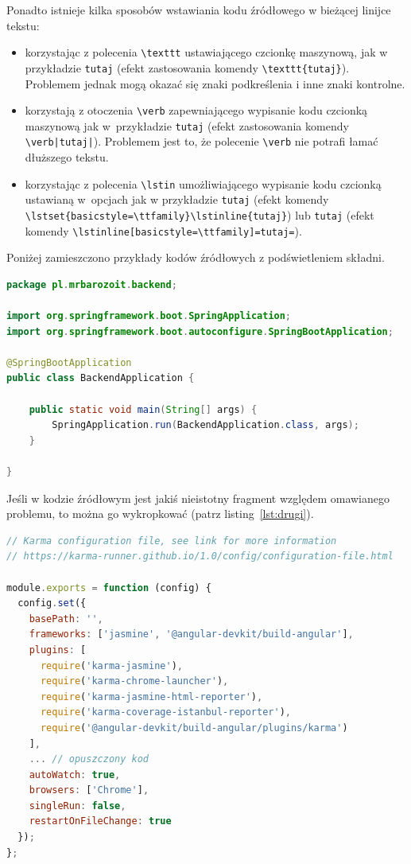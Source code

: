 Ponadto istnieje kilka sposobów wstawiania kodu źródłowego w bieżącej linijce tekstu:
\begin{itemize} 
\item korzystając z polecenia \verb?\texttt? ustawiającego czcionkę maszynową, jak w przykładzie \texttt{tutaj} (efekt zastosowania komendy \verb?\texttt{tutaj}?). Problemem jednak mogą okazać się znaki podkreślenia i inne znaki kontrolne.
\item korzystają z otoczenia \verb?\verb? zapewniającego wypisanie kodu czcionką maszynową jak w~przykładzie \verb|tutaj| (efekt zastosowania komendy \verb?\verb|tutaj|?). Problemem jest to, że polecenie \verb?\verb? nie potrafi łamać dłuższego tekstu.
\item korzystając z polecenia \verb?\lstin? umożliwiającego wypisanie kodu czcionką ustawianą w~opcjach jak w przykładzie
\lstset{basicstyle=\ttfamily}\lstinline{tutaj} (efekt komendy \verb+\lstset{basicstyle=\ttfamily}\lstinline{tutaj}+) lub \lstinline[basicstyle=\ttfamily]=tutaj= (efekt komendy \verb+\lstinline[basicstyle=\ttfamily]=tutaj=+).
\end{itemize}

Poniżej zamieszczono przykłady kodów źródłowych z podświetleniem składni.

\begin{lstlisting}[language=Java,style=JavaStyle,caption=Opis 1, label=lst:pierwszy]
package pl.mrbarozoit.backend;

import org.springframework.boot.SpringApplication;
import org.springframework.boot.autoconfigure.SpringBootApplication;

@SpringBootApplication
public class BackendApplication {

    public static void main(String[] args) {
        SpringApplication.run(BackendApplication.class, args);
    }

}
\end{lstlisting}

Jeśli w kodzie źródłowym jest jakiś nieistotny fragment względem omawianego problemu, to można go wykropkować (patrz listing~\ref{lst:drugi}).

{\belowcaptionskip=-9pt %
\begin{lstlisting}[language=JavaScript,style=JavaScriptStyle,caption=Opis 2, label=lst:drugi]
// Karma configuration file, see link for more information
// https://karma-runner.github.io/1.0/config/configuration-file.html

module.exports = function (config) {
  config.set({
    basePath: '',
    frameworks: ['jasmine', '@angular-devkit/build-angular'],
    plugins: [
      require('karma-jasmine'),
      require('karma-chrome-launcher'),
      require('karma-jasmine-html-reporter'),
      require('karma-coverage-istanbul-reporter'),
      require('@angular-devkit/build-angular/plugins/karma')
    ],
    ... // opuszczony kod
    autoWatch: true,
    browsers: ['Chrome'],
    singleRun: false,
    restartOnFileChange: true
  });
};
\end{lstlisting}
}

